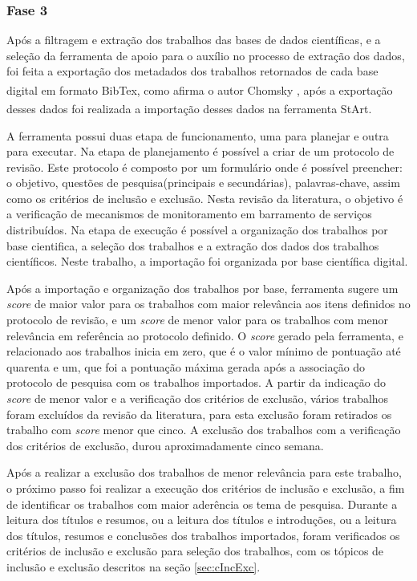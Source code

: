 \subsubsection{Fase 3} Após a filtragem e extração dos trabalhos das bases de dados científicas, e a seleção da ferramenta de apoio para o auxílio no processo de extração dos dados, foi feita a exportação dos metadados dos trabalhos retornados de cada base digital em formato BibTex\textsuperscript{\textregistered}, como afirma o autor Chomsky \cite{chomsky1969linguistica}, após a exportação desses dados foi realizada a importação desses dados na ferramenta \acrshort{StArt}\textsuperscript{\textregistered}. 

A ferramenta possui duas etapa de funcionamento, uma para planejar e outra para executar. Na etapa de planejamento é possível a criar de um protocolo de revisão. Este protocolo é composto por um formulário onde é possível preencher: o objetivo, questões de pesquisa(principais e secundárias), palavras-chave, assim como os critérios de inclusão e exclusão. Nesta revisão da literatura, o objetivo é a verificação de mecanismos de monitoramento em barramento de serviços distribuídos. Na etapa de execução é possível a organização dos trabalhos por base cientifica, a seleção dos trabalhos e a extração dos dados dos trabalhos científicos. Neste trabalho, a importação foi organizada por base científica digital. 

Após a importação e organização dos trabalhos por base, ferramenta sugere um \textit{score} de maior valor para os trabalhos com maior relevância aos itens definidos no protocolo de revisão, e um \textit{score} de menor valor para os trabalhos com menor relevância em referência ao protocolo definido. O \textit{score} gerado pela ferramenta, e relacionado aos trabalhos inicia em zero, que é o valor mínimo de pontuação até quarenta e um, que foi a pontuação máxima gerada após a associação do protocolo de pesquisa com os trabalhos importados. A partir da indicação do \textit{score} de menor valor e a verificação dos critérios de exclusão, vários trabalhos foram excluídos da revisão da literatura, para esta exclusão foram retirados os trabalho com \textit{score} menor que cinco. A exclusão dos trabalhos com a verificação dos critérios de exclusão, durou aproximadamente cinco semana. 

Após a realizar a exclusão dos trabalhos de menor relevância para este trabalho, o próximo passo foi realizar a execução dos critérios de inclusão e exclusão, a fim de identificar os trabalhos com maior aderência os tema de pesquisa. Durante a leitura dos títulos e resumos, ou a leitura dos títulos e introduções, ou a leitura dos títulos, resumos e conclusões dos trabalhos importados, foram verificados os critérios de inclusão e exclusão para seleção dos trabalhos, com os tópicos de inclusão e exclusão descritos na seção \ref{sec:cIncExc}. 

